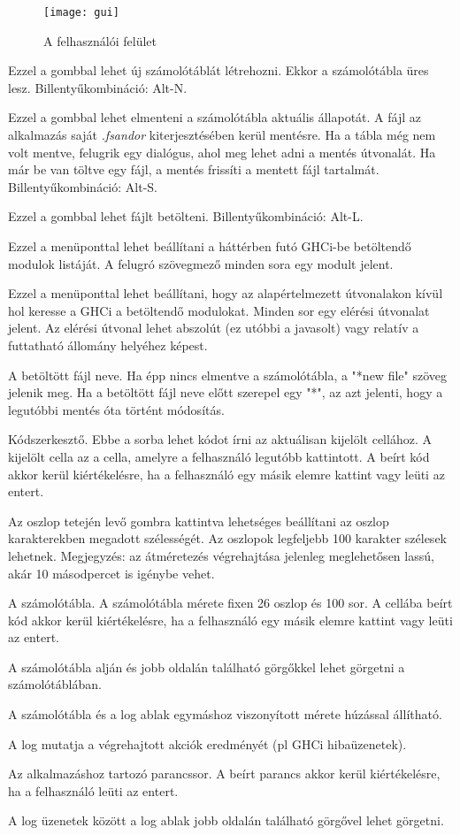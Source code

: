 \begin{figure}[H]
	\centering
	\texttt{[image: gui]}
	\caption{A felhasználói felület}
	\label{fig:gui}
\end{figure}

\begin{compactenum}
	\item Ezzel a gombbal lehet új számolótáblát létrehozni. Ekkor a számolótábla üres lesz. Billentyűkombináció: Alt-N.
	\item Ezzel a gombbal lehet elmenteni a számolótábla aktuális állapotát. A fájl az alkalmazás saját \textit{.fsandor} kiterjesztésében kerül mentésre. Ha a tábla még nem volt mentve, felugrik egy dialógus, ahol meg lehet adni a mentés útvonalát. Ha már be van töltve egy fájl, a mentés frissíti a mentett fájl tartalmát. Billentyűkombináció: Alt-S.
	\item Ezzel a gombbal lehet fájlt betölteni. Billentyűkombináció: Alt-L.
	\item Ezzel a menüponttal lehet beállítani a háttérben futó GHCi-be betöltendő modulok listáját. A felugró szövegmező minden sora egy modult jelent.
	\item Ezzel a menüponttal lehet beállítani, hogy az alapértelmezett útvonalakon kívül hol keresse a GHCi a betöltendő modulokat. Minden sor egy elérési útvonalat jelent. Az elérési útvonal lehet abszolút (ez utóbbi a javasolt) vagy relatív a futtatható állomány helyéhez képest.
	\item A betöltött fájl neve. Ha épp nincs elmentve a számolótábla, a "*new file" szöveg jelenik meg. Ha a betöltött fájl neve előtt szerepel egy "*", az azt jelenti, hogy a legutóbbi mentés óta történt módosítás.
	\item Kódszerkesztő. Ebbe a sorba lehet kódot írni az aktuálisan kijelölt cellához. A kijelölt cella az a cella, amelyre a felhasználó legutóbb kattintott. A beírt kód akkor kerül kiértékelésre, ha a felhasználó egy másik elemre kattint vagy leüti az entert.
	\item Az oszlop tetején levő gombra kattintva lehetséges beállítani az oszlop karakterekben megadott szélességét. Az oszlopok legfeljebb 100 karakter szélesek lehetnek. Megjegyzés: az átméretezés végrehajtása jelenleg meglehetősen lassú, akár 10 másodpercet is igénybe vehet.
	\item A számolótábla. A számolótábla mérete fixen 26 oszlop és 100 sor. A cellába beírt kód akkor kerül kiértékelésre, ha a felhasználó egy másik elemre kattint vagy leüti az entert.
	\item A számolótábla alján és jobb oldalán található görgőkkel lehet görgetni a számolótáblában.
	\item A számolótábla és a log ablak egymáshoz viszonyított mérete húzással állítható. 
	\item A log mutatja a végrehajtott akciók eredményét (pl GHCi hibaüzenetek).
	\item Az alkalmazáshoz tartozó parancssor. A beírt parancs akkor kerül kiértékelésre, ha a felhasználó leüti az entert.
	\item A log üzenetek között a log ablak jobb oldalán található görgővel lehet görgetni.
\end{compactenum}

